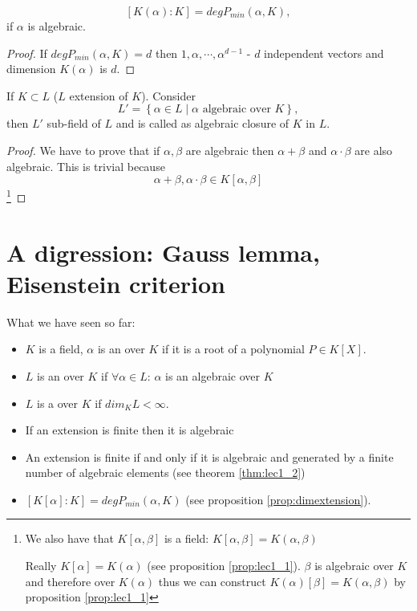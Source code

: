 \begin{proposition}
  \[
  \left[K\left(\alpha\right) : K\right] =
  deg P_{min}\left(\alpha, K\right),
  \]
  if $\alpha$ is algebraic.
  \begin{proof}
    If $deg P_{min}\left(\alpha, K\right) = d$ then $1, \alpha,
    \cdots, \alpha^{d-1}$ - $d$ independent vectors and dimension
    $K\left(\alpha\right)$ is $d$.
  \end{proof}
  \label{prop:dimextension}
\end{proposition}

\begin{proposition}
  If $K \subset L$ ($L$ extension of $K$). Consider
  \[
  L' = \left\{
  \alpha \in L \mid \alpha \mbox{ algebraic over } K
  \right\},
  \]
  then $L'$ sub-field of $L$ and is called as algebraic closure of $K$
  in $L$.
  \begin{proof}
    We have to prove that if $\alpha, \beta$ are algebraic then
    $\alpha + \beta$ and $\alpha \cdot \beta$ are also algebraic. This
    is trivial  because
    \[
    \alpha + \beta, \alpha \cdot \beta \in K\left[\alpha, \beta\right]
    \]
    \footnote{
      We also have that $K\left[\alpha, \beta\right]$ is a field:
      $K\left[\alpha, \beta\right]
      = K\left(\alpha, \beta\right)$

      Really
      $K\left[\alpha\right] =
      K\left(\alpha\right)$ (see proposition
      \ref{prop:lec1_1}). $\beta$ is algebraic over $K$ and 
      therefore over $K\left(\alpha\right)$ thus we can construct
      $K\left(\alpha\right)\left[\beta\right] = K\left(\alpha, \beta\right)$
      by proposition \ref{prop:lec1_1}
    }
  \end{proof}
\end{proposition}


\section{A digression: Gauss lemma, Eisenstein criterion}

What we have seen so far:

\begin{itemize}
\item $K$ is a field, $\alpha$ is an 
  over $K$ if it is a root of a polynomial $P \in K\left[X\right]$.
\item $L$ is an  over $K$ if
  $\forall \alpha \in L$: $\alpha$ is an algebraic over $K$
\item $L$ is a  over $K$ if $dim_K L <
  \infty$.
\item If an extension is finite then it is algebraic
\item An extension is finite if and only if it is algebraic and
  generated by a finite number of algebraic elements (see theorem
  \ref{thm:lec1_2})
\item $\left[K\left[\alpha\right]:K\right] =
  deg P_{min}\left(\alpha, K\right)$ (see proposition
  \ref{prop:dimextension}). 
\end{itemize}

